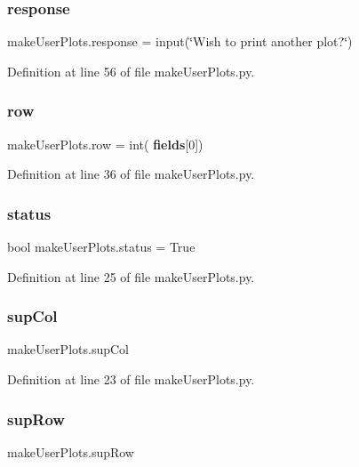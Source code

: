 \subsubsection{response}
{\footnotesize\ttfamily make\+User\+Plots.\+response = input(\char`\"{}Wish to print another plot?\char`\"{})}



Definition at line 56 of file make\+User\+Plots.\+py.

\mbox{\label{namespacemake_user_plots_a66e9b661dcdf6e1cb2763a22168d20fc}} 
\subsubsection{row}
{\footnotesize\ttfamily make\+User\+Plots.\+row = int(\textbf{ fields}[0])}



Definition at line 36 of file make\+User\+Plots.\+py.

\mbox{\label{namespacemake_user_plots_a2548bb5e0dc7bff3caa3e0c97b9ac1d9}} 
\subsubsection{status}
{\footnotesize\ttfamily bool make\+User\+Plots.\+status = True}



Definition at line 25 of file make\+User\+Plots.\+py.

\mbox{\label{namespacemake_user_plots_af4f84bae64d363756e62ba9397ca2fd3}} 
\subsubsection{sup\+Col}
{\footnotesize\ttfamily make\+User\+Plots.\+sup\+Col}



Definition at line 23 of file make\+User\+Plots.\+py.

\mbox{\label{namespacemake_user_plots_a4b914a1b7ff2ce0d51e688a462f216ae}} 
\subsubsection{sup\+Row}
{\footnotesize\ttfamily make\+User\+Plots.\+sup\+Row}




